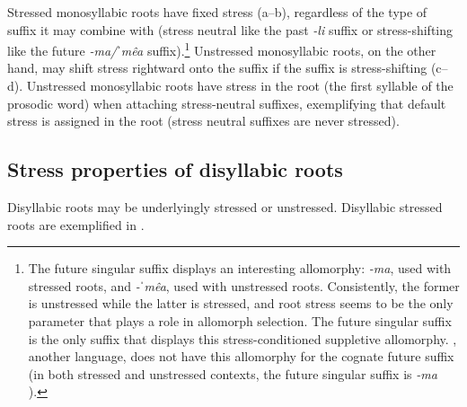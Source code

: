 Stressed monosyllabic roots have fixed stress (a--b), regardless of the type of suffix it may combine with (stress neutral like the past \textit{-li} suffix or stress-shifting like the future \textit{-ma/ˈmêa} suffix).\footnote{The future singular suffix displays an interesting allomorphy: \textit{-ma}, used with stressed roots, and \textit{-ˈmêa}, used with unstressed roots. Consistently, the former is unstressed while the latter is stressed, and root stress seems to be the only parameter that plays a role in allomorph selection. The future singular suffix is the only suffix that displays this stress-conditioned suppletive allomorphy. , another  language, does not have this allomorphy for the cognate future suffix (in both stressed and unstressed contexts, the future singular suffix is \textit{-ma} \citealt{miller1996guarijio}).} Unstressed monosyllabic roots, on the other hand, may shift stress rightward onto the suffix if the suffix is stress-shifting (c--d). Unstressed monosyllabic roots have stress in the root (the first syllable of the prosodic word) when attaching stress-neutral suffixes, exemplifying that default stress is assigned in the root (stress neutral suffixes are never stressed).

\subsection{Stress properties of disyllabic roots}
\label{subsubsec*: stress properties of disyllabic roots}

Disyllabic roots may be underlyingly stressed or unstressed. Disyllabic stressed roots are exemplified in .

